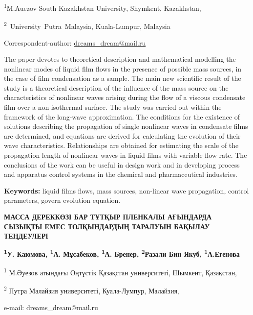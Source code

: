 


\begin{affiliation}
\textsuperscript{1}M.Auezov South Kazakhstan University, Shymkent, Kazakhstan,

\textsuperscript{2}~University~Putra~Malaysia, Kuala-Lumpur, Malaysia

\raggedright \textsuperscript{\envelope } Correspondent-author: \href{mailto:dreams_dream@mail.ru}{dreams\_dream@mail.ru}
\end{affiliation}

The paper devotes to theoretical description and mathematical modelling
the nonlinear modes of liquid film flows in the presence of possible
mass sources, in the case of film condensation as a sample. The main new
scientific result of the study is a theoretical description of the
influence of the mass source on the characteristics of nonlinear waves
arising during the flow of a viscous condensate film over a
non-isothermal surface. The study was carried out within the framework
of the long-wave approximation. The conditions for the existence of
solutions describing the propagation of single nonlinear waves in
condensate films are determined, and equations are derived for
calculating the evolution of their wave characteristics. Relationships
are obtained for estimating the scale of the propagation length of
nonlinear waves in liquid films with variable flow rate. The conclusions
of the work can be useful in design work and in developing process and
apparatus control systems in the chemical and pharmaceutical industries.

{\bfseries Keywords:} liquid films flows, mass sources, non-linear wave
propagation, control parameters, govern evolution equation.

\begin{articleheader}
{\bfseries МАССА ДЕРЕККӨЗІ БАР ТҰТҚЫР ПЛЕНКАЛЫ АҒЫНДАРДА СЫЗЫҚТЫ ЕМЕС
ТОЛҚЫНДАРДЫҢ ТАРАЛУЫН БАҚЫЛАУ ТЕҢДЕУЛЕРІ}

{\bfseries
\textsuperscript{1}У. Каюмова\textsuperscript{\envelope },
\textsuperscript{1}А. Мұсабеков,
\textsuperscript{1}А. Бренер,
\textsuperscript{2}Разали Бин Якуб,
\textsuperscript{1}А.Егенова
}
\end{articleheader}

\begin{affiliation}
\textsuperscript{1} М.Әуезов атындағы Оңтүстік Қазақстан университеті, Шымкент, Қазақстан,

\textsuperscript{2} Путра Малайзия университеті, Куала-Лумпур, Малайзия,

e-mail: dreams\_dream@mail.ru
\end{affiliation}

